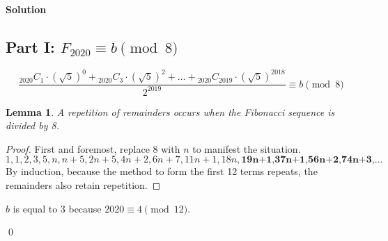 \documentclass{article}
\newtheorem*{lemma*}{Lemma}
\newenvironment{solution}{\begin{trivlist}\item[]
{\bf Solution}}{\qed \end{trivlist}}
\begin{document}
\begin{solution}
\subsection*{Part I: $F_{2020} \equiv b \pmod{8}$}
\[
\frac{{}_{2020}C_{1}\cdot(\sqrt{5})^0+{}_{2020}C_{3}\cdot(\sqrt{5})^2+\dots+{}_{2020}C_{2019}\cdot(\sqrt{5})^{2018}}{2^{2019}} \equiv b \pmod{8}
\]
\begin{lemma*}
    A repetition of remainders occurs when the Fibonacci sequence is divided by 8.
\end{lemma*}
\begin{proof}
First and foremost, replace $8$ with $n$ to manifest the situation.
\[
1,1,2,3,5,n,n+5,2n+5,4n+2,6n+7,11n+1,18n,\textbf{19n+1,37n+1,56n+2,74n+3,}\dots
\]
By induction, because the method to form the first 12 terms repeats, the remainders also retain repetition.
\end{proof}
\noindent
$b$ is equal to 3 because $2020\equiv4\pmod{12}$.

\end{solution}
\end{document}
